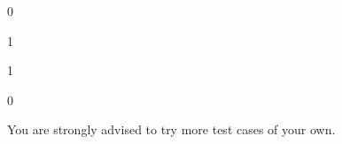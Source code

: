 \resett
\nextt
\begin{console}[fontsize=\small,commandchars=\\\{\}]
0
\end{console}

\nextt
\begin{console}[fontsize=\small,commandchars=\\\{\}]
1
\end{console}

\nextt
\begin{console}[fontsize=\small,commandchars=\\\{\}]
1
\end{console}

\nextt
\begin{console}[fontsize=\small,commandchars=\\\{\}]
0
\end{console}

You are strongly advised to try more test cases of your own.

